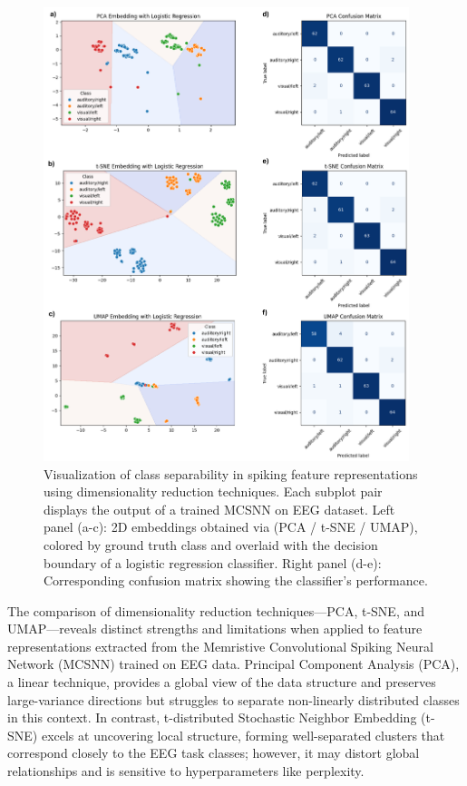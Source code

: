 \begin{figure}[!t]
    \centerline{\includegraphics[width=0.95\textwidth]{Chapter7/Figs/f.png}}
    \caption[Visualization of class separability in spiking feature representations using dimensionality reduction techniques.]{Visualization of class separability in spiking feature representations using dimensionality reduction techniques. Each subplot pair displays the output of a trained MCSNN on EEG dataset. Left panel (a-c): 2D embeddings obtained via (PCA / t-SNE / UMAP), colored by ground truth class and overlaid with the decision boundary of a logistic regression classifier.
    Right panel (d-e): Corresponding confusion matrix showing the classifier's performance.}
    \label{fig:7f}
\end{figure}

\noindent The comparison of dimensionality reduction techniques—PCA, t-SNE, and UMAP—reveals distinct strengths and limitations when applied to feature representations extracted from the Memristive Convolutional Spiking Neural Network (MCSNN) trained on EEG data. Principal Component Analysis (PCA), a linear technique, provides a global view of the data structure and preserves large-variance directions but struggles to separate non-linearly distributed classes in this context. In contrast, t-distributed Stochastic Neighbor Embedding (t-SNE) excels at uncovering local structure, forming well-separated clusters that correspond closely to the EEG task classes; however, it may distort global relationships and is sensitive to hyperparameters like perplexity. \\

